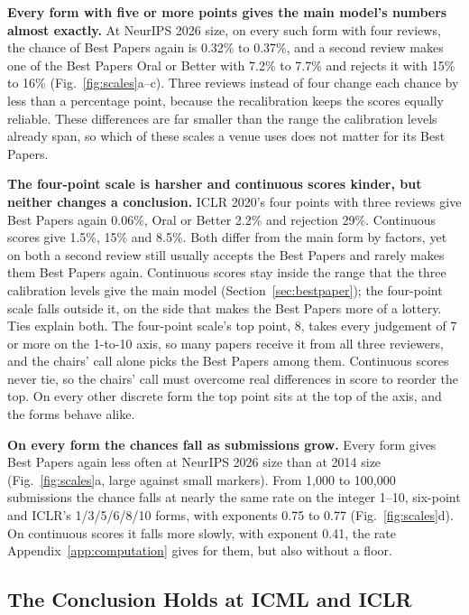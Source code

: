 \documentclass{article}
\begin{document}
\textbf{Every form with five or more points gives the main model's numbers almost exactly.} At NeurIPS 2026 size, on every such form with four reviews, the chance of Best Papers again is 0.32\% to 0.37\%, and a second review makes one of the Best Papers Oral or Better with 7.2\% to 7.7\% and rejects it with 15\% to 16\% (Fig.~\ref{fig:scales}a--c). Three reviews instead of four change each chance by less than a percentage point, because the recalibration keeps the scores equally reliable. These differences are far smaller than the range the calibration levels already span, so which of these scales a venue uses does not matter for its Best Papers.

\textbf{The four-point scale is harsher and continuous scores kinder, but neither changes a conclusion.} ICLR 2020's four points with three reviews give Best Papers again 0.06\%, Oral or Better 2.2\% and rejection 29\%. Continuous scores give 1.5\%, 15\% and 8.5\%. Both differ from the main form by factors, yet on both a second review still usually accepts the Best Papers and rarely makes them Best Papers again. Continuous scores stay inside the range that the three calibration levels give the main model (Section~\ref{sec:bestpaper}); the four-point scale falls outside it, on the side that makes the Best Papers more of a lottery. Ties explain both. The four-point scale's top point, 8, takes every judgement of 7 or more on the 1-to-10 axis, so many papers receive it from all three reviewers, and the chairs' call alone picks the Best Papers among them. Continuous scores never tie, so the chairs' call must overcome real differences in score to reorder the top. On every other discrete form the top point sits at the top of the axis, and the forms behave alike.

\textbf{On every form the chances fall as submissions grow.} Every form gives Best Papers again less often at NeurIPS 2026 size than at 2014 size (Fig.~\ref{fig:scales}a, large against small markers). From 1,000 to 100,000 submissions the chance falls at nearly the same rate on the integer 1--10, six-point and ICLR's 1/3/5/6/8/10 forms, with exponents 0.75 to 0.77 (Fig.~\ref{fig:scales}d). On continuous scores it falls more slowly, with exponent 0.41, the rate Appendix~\ref{app:computation} gives for them, but also without a floor.

\subsection{The Conclusion Holds at ICML and ICLR}\label{app:venues}
\end{document}
